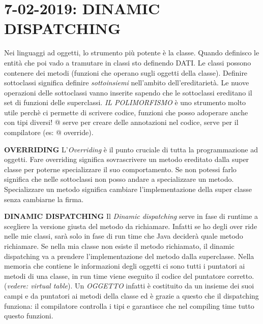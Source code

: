 

\newpage
\section{7-02-2019: DINAMIC DISPATCHING}
Nei linguaggi ad oggetti, lo strumento più potente è la classe. Quando definisco le entità che poi vado a tramutare in classi sto definendo DATI. \newline
Le classi possono contenere dei metodi (funzioni che operano sugli oggetti della classe). \newline
Definire sottoclassi significa definire \textit{sottoinsiemi} nell'ambito dell'ereditarietà. Le nuove operazioni delle sottoclassi vanno inserite sapendo che le sottoclassi ereditano il set di funzioni delle superclassi. 
\textit{IL POLIMORFISMO} è uno strumento molto utile perchè ci permette di scrivere codice, funzioni che posso adoperare anche con tipi diversi! \newline
@ serve per creare delle annotazioni nel codice, serve per il compilatore (es: @ override).

\noindent \textbf{OVERRIDING} \newline
L'\textit{Overriding} è il punto cruciale di tutta la programmazione ad oggetti. Fare overriding significa sovrascrivere un metodo ereditato dalla super classe per poterne specializzare il suo comportamento. Se non potessi farlo significa che nelle sottoclassi non posso andare a specializzare un metodo. Specializzare un metodo significa cambiare l'implementazione della super classe senza cambiarne la firma. 


\noindent \textbf{DINAMIC DISPATCHING} \newline
Il \textit{Dinamic dispatching} serve in fase di runtime a scegliere la versione giusta del metodo da richiamare. Infatti se ho degli over ride nelle mie classi, sarà solo in fase di run time che Java deciderà quale metodo richiamare. Se nella mia classe non esiste il metodo richiamato, il dinamic dispatching va a prendere l'implementazione del metodo dalla superclasse. Nella memoria che contiene le informazioni degli oggetti ci sono tutti i puntatori ai metodi di una classe, in run time viene eseguito il codice del puntatore corretto. (\textit{vedere: virtual table}).
Un \textit{OGGETTO} infatti è costituito da un insieme dei suoi campi e da puntatori ai metodi della classe ed è grazie a questo che il dispatching funziona: il compilatore controlla i tipi e garantisce che nel compiling time tutto questo funzioni. 

